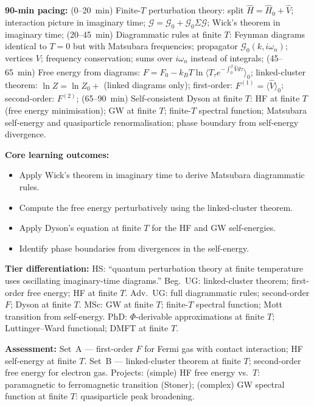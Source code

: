 \documentclass[11pt,a4paper]{article}
\begin{document}
\medskip

\begin{tcolorbox}[modulebox, title={Module~II.7 --- Lecture L07: Perturbation Theory at Finite Temperature}]
\textbf{90-min pacing:} (0--20~min) Finite-$T$ perturbation theory: split $\hat{H}=\hat{H}_0+\hat{V}$; interaction picture in imaginary time; $\mathcal{G}=\mathcal{G}_0+\mathcal{G}_0\Sigma\mathcal{G}$; Wick's theorem in imaginary time; (20--45~min) Diagrammatic rules at finite $T$: Feynman diagrams identical to $T=0$ but with Matsubara frequencies; propagator $\mathcal{G}_0(k,i\omega_n)$; vertices $V$; frequency conservation; sums over $i\omega_n$ instead of integrals; (45--65~min) Free energy from diagrams: $F=F_0-k_BT\ln\langle T_\tau e^{-\int_0^\beta\hat{V}d\tau}\rangle_0$; linked-cluster theorem: $\ln Z=\ln Z_0+$ (linked diagrams only); first-order: $F^{(1)}=\langle\hat{V}\rangle_0$; second-order: $F^{(2)}$; (65--90~min) Self-consistent Dyson at finite $T$: HF at finite $T$ (free energy minimisation); GW at finite $T$; finite-$T$ spectral function; Matsubara self-energy and quasiparticle renormalisation; phase boundary from self-energy divergence.

\medskip\textbf{Core learning outcomes:}
\begin{itemize}[leftmargin=1.4em,topsep=2pt,itemsep=1pt]
  \item Apply Wick's theorem in imaginary time to derive Matsubara diagrammatic rules.
  \item Compute the free energy perturbatively using the linked-cluster theorem.
  \item Apply Dyson's equation at finite $T$ for the HF and GW self-energies.
  \item Identify phase boundaries from divergences in the self-energy.
\end{itemize}

\medskip\textbf{Tier differentiation:}
HS: ``quantum perturbation theory at finite temperature uses oscillating imaginary-time diagrams.''
Beg.\ UG: linked-cluster theorem; first-order free energy; HF at finite $T$.
Adv.\ UG: full diagrammatic rules; second-order $F$; Dyson at finite $T$.
MSc: GW at finite $T$; finite-$T$ spectral function; Mott transition from self-energy.
PhD: $\Phi$-derivable approximations at finite $T$; Luttinger--Ward functional; DMFT at finite $T$.

\medskip\textbf{Assessment:}
Set~A --- first-order $F$ for Fermi gas with contact interaction; HF self-energy at finite $T$.
Set~B --- linked-cluster theorem at finite $T$; second-order free energy for electron gas.
Projects: (simple) HF free energy vs.\ $T$: paramagnetic to ferromagnetic transition (Stoner);
(complex) GW spectral function at finite $T$: quasiparticle peak broadening.
\end{tcolorbox}
\end{document}
